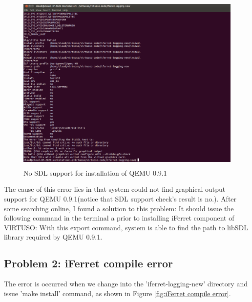 \begin{figure}[htbp]
	\centering
		\includegraphics[width=14cm, height= 9cm ]{Figures/Figure32.png}
	\caption[No SDL support for installation of QEMU 0.9.1]{No SDL support for installation of QEMU 0.9.1}
	\label{fig:No SDL support for installation of QEMU 0.9.1}
\end{figure}

The cause of this error lies in that system could not find graphical output support for QEMU 0.9.1(notice that SDL support check's 
result is no.). After some searching online, I found a solution to this problem: It should issue the following command in the terminal a prior to
installing iFerret component of VIRTUSO:
With this export command, system is able to find the path to libSDL library required by QEMU 0.9.1.


\subsection{Problem 2: iFerret compile error}
The error is occurred when we change into the 'iferret-logging-new' directory and issue 'make install' command, as shown in Figure 
\ref{fig:iFerret compile error}.


